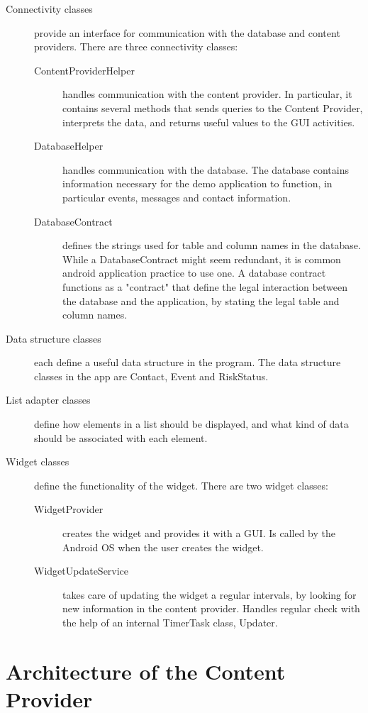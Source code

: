\begin{description}
\item[Connectivity classes]
provide an interface for communication with the database and content providers. There are three connectivity classes:
\begin{description}
\item[ContentProviderHelper] handles communication with the content provider. In particular, it contains several methods that sends queries to the Content Provider, interprets the data, and returns useful values to the GUI activities.
\item[DatabaseHelper] handles communication with the database. The database contains information necessary for the demo application to function, in particular events, messages and contact information.
\item[DatabaseContract] defines the strings used for table and column names in the database. While a DatabaseContract might seem redundant, it is common android application practice to use one. A database contract functions as a "contract" that define the legal interaction between the database and the application, by stating the legal table and column names.
\end{description}

\item[Data structure classes]
each define a useful data structure in the program. The data structure classes in the app are Contact, Event and RiskStatus.

\item[List adapter classes]
define how elements in a list should be displayed, and what kind of data should be associated with each element.
\item[Widget classes]
define the functionality of the widget. There are two widget classes:
\begin{description}
\item[WidgetProvider] creates the widget and provides it with a GUI. Is called by the Android OS when the user creates the widget.
\item[WidgetUpdateService] takes care of updating the widget a regular intervals, by looking for new information in the content provider. Handles regular check with the help of an internal TimerTask class, Updater.
\end{description}
\end{description}
\section{Architecture of the Content Provider}

